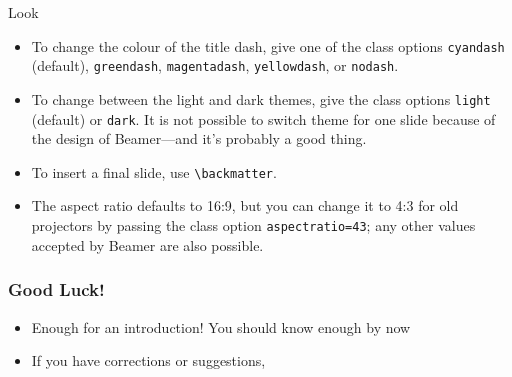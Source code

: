 \begin{frame}[fragile]{Look}
\begin{itemize}
\item To change the colour of the title dash, give one of the class options
      \texttt{cyandash} (default), \texttt{greendash}, \texttt{magentadash},
      \texttt{yellowdash}, or \texttt{nodash}.
\item To change between the light and dark themes, give the class options
      \texttt{light} (default) or \texttt{dark}. It is not possible to switch
      theme for one slide because of the design of Beamer---and it's probably a
      good thing.
\item To insert a final slide, use \verb|\backmatter|.
\item The aspect ratio defaults to 16:9, but you can change it to 4:3 for old
      projectors by passing the class option \texttt{aspectratio=43}; any other
      values accepted by Beamer are also possible.
\end{itemize}
\end{frame}


\begin{frame}
\frametitle{Good Luck!}
\begin{itemize}
\item Enough for an introduction! You should know enough by now
\item If you have corrections or suggestions,
\end{itemize}
\end{frame}

